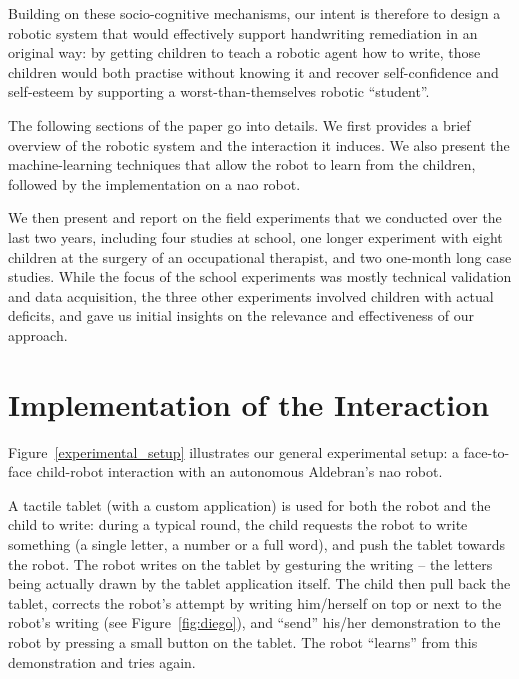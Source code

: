 \documentclass{article}
\begin{document}
Building on these socio-cognitive mechanisms, our intent is therefore to design
a robotic system that would effectively support handwriting remediation in an
original way: by getting children to teach a robotic agent how to write, those
children would both practise without knowing it and recover self-confidence and
self-esteem by supporting a worst-than-themselves robotic ``student''.

The following sections of the paper go into details. We first provides a
brief overview of the robotic system and the interaction it induces. We also
present the machine-learning techniques that allow the robot to learn
from the children, followed by the implementation on a {\sc nao} robot.

We then present and report on the field experiments that we conducted over the
last two years, including four studies at school, one longer experiment
with eight children at the surgery of an occupational therapist, and two
one-month long case studies. While the focus of the school
experiments was mostly technical validation and data acquisition, the three
other experiments involved children with actual deficits, and gave us initial insights on the
relevance and effectiveness of our approach.

\section{Implementation of the Interaction}

Figure~\ref{experimental_setup} illustrates our general experimental setup: a
face-to-face child-robot interaction with an autonomous Aldebran's {\sc nao}
robot.

A tactile tablet (with a custom application) is used for both the robot and the
child to write: during a typical round, the child requests the robot to write
something (a single letter, a number or a full word), and push the tablet
towards the robot. The robot writes on the tablet by gesturing the writing -- the
letters being actually drawn by the tablet application itself. The child then pull back the
tablet, corrects the robot's attempt by writing him/herself on top or next to
the robot's writing (see Figure~\ref{fig:diego}), and ``send'' his/her
demonstration to the robot by pressing a small button on the tablet. The robot
``learns'' from this demonstration and tries again.
\end{document}
